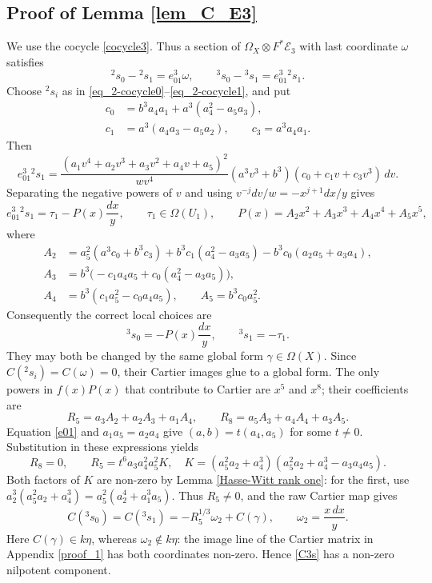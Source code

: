 \documentclass[12pt,a4]{amsart}
\theoremstyle{definition}
\begin{document}
\begin{appendix}
\subsection{Proof of Lemma \ref{lem_C_E3}}\label{proof_5}
We use the cocycle \eqref{cocycle3}. Thus a section of
$\Omega_X\otimes F^*\mathcal E_3$ with last coordinate $\omega$ satisfies
\[
{}^2s_0-{}^2s_1=e_{01}^3\omega,
\qquad {}^3s_0-{}^3s_1=e_{01}^3{}^2s_1.
\]
Choose ${}^2s_i$ as in \eqref{eq_2-cocycle0}--\eqref{eq_2-cocycle1},
and put
\[
\begin{aligned}
c_0&=b^3a_4a_1+a^3(a_4^2-a_5a_3),\\
c_1&=a^3(a_4a_3-a_5a_2),\qquad c_3=a^3a_4a_1.
\end{aligned}
\]
Then
\[
e_{01}^3{}^2s_1=
\frac{(a_1v^4+a_2v^3+a_3v^2+a_4v+a_5)^2}{wv^4}
(a^3v^3+b^3)(c_0+c_1v+c_3v^3)\,dv.
\]
Separating the negative powers of $v$ and using
$v^{-j}dv/w=-x^{j+1}dx/y$ gives
\[
e_{01}^3{}^2s_1=\tau_1-P(x)\frac{dx}{y},
\qquad \tau_1\in\Omega(U_1),\qquad
P(x)=A_2x^2+A_3x^3+A_4x^4+A_5x^5,
\]
where
\[
\begin{aligned}
A_2&=a_5^2(a^3c_0+b^3c_3)
       +b^3c_1(a_4^2-a_3a_5)-b^3c_0(a_2a_5+a_3a_4),\\
A_3&=b^3\bigl(-c_1a_4a_5+c_0(a_4^2-a_3a_5)\bigr),\\
A_4&=b^3(c_1a_5^2-c_0a_4a_5),\qquad A_5=b^3c_0a_5^2.
\end{aligned}
\]
Consequently the correct local choices are
\[
{}^3s_0=-P(x)\frac{dx}{y},\qquad {}^3s_1=-\tau_1.
\]
They may both be changed by the same global form $\gamma\in\Omega(X)$.
Since $C({}^2s_i)=C(\omega)=0$, their Cartier images glue to a global form.
The only powers in $f(x)P(x)$ that contribute to Cartier are $x^5$ and $x^8$;
their coefficients are
\[
R_5=a_3A_2+a_2A_3+a_1A_4,\qquad
R_8=a_5A_3+a_4A_4+a_3A_5.
\]
Equation \eqref{e01} and $a_1a_5=a_2a_4$ give
$(a,b)=t(a_4,a_5)$ for some $t\ne0$.
Substitution in these expressions yields
\[
R_8=0,\qquad
R_5=t^6a_3a_4^2a_5^2K,
\quad K=(a_5^2a_2+a_4^3)(a_5^2a_2+a_4^3-a_3a_4a_5).
\]
Both factors of $K$ are non-zero by Lemma \ref{Hasse-Witt rank one}:
for the first, use
$a_2^3(a_5^2a_2+a_4^3)=a_5^2(a_2^4+a_1^3a_5)$.
Thus $R_5\ne0$, and the raw Cartier map gives
\begin{equation}\label{C3s}
C({}^3s_0)=C({}^3s_1)
=-R_5^{1/3}\omega_2+C(\gamma),
\qquad \omega_2=\frac{x\,dx}{y}.
\end{equation}
Here $C(\gamma)\in k\eta$, whereas $\omega_2\notin k\eta$:
the image line of the Cartier matrix in Appendix \ref{proof_1}
has both coordinates non-zero. Hence \eqref{C3s} has a non-zero
nilpotent component.


\end{appendix}
\end{document}
